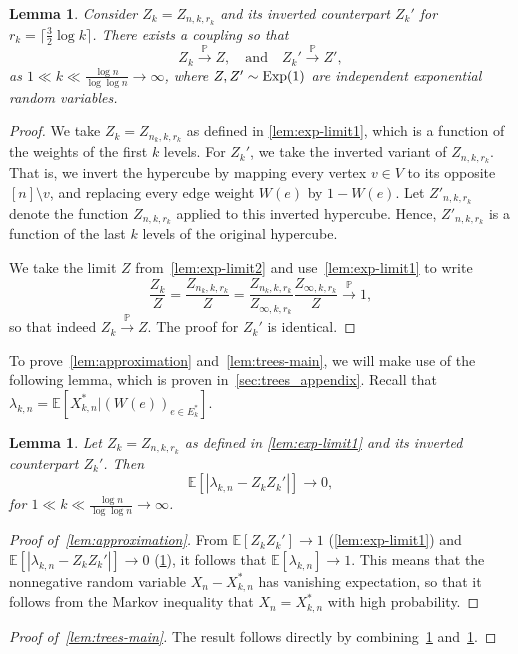 \documentclass[11pt]{article}
\newtheorem{lemma}[theorem]{Lemma}
\theoremstyle{definition}
\theoremstyle{remark}
\theoremstyle{remark}
\numberwithin{theorem}{section}
\providecommand{\P}{}
\renewcommand{\P}{\mathbb{P}}
\newcommand{\E}{\mathbb{E}}
\begin{document}
\begin{lemma}\label{lem:exp-limit}
    Consider $Z_k=Z_{n,k,r_k}$ and its inverted counterpart $Z_k'$ for $r_k=\lceil\frac32\log k\rceil$.
    There exists a coupling so that
    \[
        Z_k\stackrel{\P}\to Z,\quad\text{and}\quad Z_k'\stackrel{\P}\to Z',
    \]
    as $1\ll k\ll\frac{\log n}{\log\log n}\to\infty$,
    where $Z,Z'\sim\textup{Exp}(1)$ are independent exponential random variables.
\end{lemma}
\begin{proof}
    We take $Z_k=Z_{n_k,k,r_k}$ as defined in \cref{lem:exp-limit1}, which is a function of the weights of the first $k$ levels. For $Z_k'$, we take the inverted variant of $Z_{n,k,r_k}$. That is, we invert the hypercube by mapping every vertex $v\in V$ to its opposite $[n]\setminus v$, and replacing every edge weight $W(e)$ by $1-W(e)$. Let $Z'_{n,k,r_k}$ denote the function $Z_{n,k,r_k}$ applied to this inverted hypercube. Hence, $Z'_{n,k,r_k}$ is a function of the last $k$ levels of the original hypercube.

    We take the limit $Z$ from~\cref{lem:exp-limit2} and use~\cref{lem:exp-limit1} to write
    \[
    \frac{Z_k}{Z}=\frac{Z_{n_k,k,r_k}}{Z}=\frac{Z_{n_k,k,r_k}}{Z_{\infty,k,r_k}}\frac{Z_{\infty,k,r_k}}{Z}\stackrel{\P}\to1,
    \]
    so that indeed $Z_k\stackrel{\P}\to Z$.
    The proof for $Z_k'$ is identical.
\end{proof}
To prove~\cref{lem:approximation} and~\cref{lem:trees-main}, we will make use of the following lemma, which is proven in~\cref{sec:trees_appendix}. Recall that $\lambda_{k,n} = \E[X_{k,n}^{*}|(W(e))_{e \in E_{k}^{*}}]$.
\begin{lemma}\label{lem:trees}
Let $Z_k=Z_{n,k,r_k}$ as defined in \cref{lem:exp-limit1} and its inverted counterpart $Z_k'$. Then
    \[
    \E[|\lambda_{k,n} - Z_{k}Z_{k}'|] \to 0,
    \]
for $1\ll k\ll \frac{\log n}{\log\log n} \to\infty$.
\end{lemma}


\begin{proof}[Proof of~\cref{lem:approximation}]
    From $\E[Z_kZ_k']\to1$ (\cref{lem:exp-limit1}) and $\E[|\lambda_{k,n} - Z_{k}Z_{k}'|] \to 0$ (\cref{lem:trees}), it follows that $\E[\lambda_{k,n}]\to1$. This means that the nonnegative random variable $X_n-X_{k,n}^{*}$ has vanishing expectation, so that it follows from the Markov inequality that $X_n=X_{k,n}^{*}$ with high probability.
\end{proof}

\begin{proof}[Proof of~\cref{lem:trees-main}]
    The result follows directly by combining~\cref{lem:exp-limit} and~\cref{lem:trees}.
\end{proof}
\end{document}
